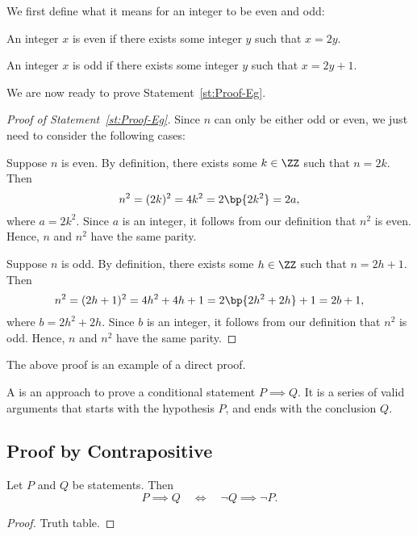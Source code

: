 We first define what it means for an integer to be even and odd:

\begin{definition}
    An integer $x$ is even if there exists some integer $y$ such that $x = 2y$.
\end{definition}

\begin{definition}
    An integer $x$ is odd if there exists some integer $y$ such that $x = 2y + 1$.
\end{definition}

We are now ready to prove Statement~\ref{st:Proof-Eg}.

\begin{proof}[Proof of Statement~\ref{st:Proof-Eg}]
    Since $n$ can only be either odd or even, we just need to consider the following cases:

     Suppose $n$ is even. By definition, there exists some $k \in \ZZ$ such that $n = 2k$. Then \[n^2 = (2k)^2 = 4k^2 = 2\bp{2k^2} = 2a,\] where $a = 2k^2$. Since $a$ is an integer, it follows from our definition that $n^2$ is even. Hence, $n$ and $n^2$ have the same parity.

     Suppose $n$ is odd. By definition, there exists some $h \in \ZZ$ such that $n = 2h + 1$. Then \[n^2 = (2h+1)^2 = 4h^2 + 4h + 1 = 2\bp{2h^2 + 2h} + 1 = 2b + 1,\] where $b = 2h^2 + 2h$. Since $b$ is an integer, it follows from our definition that $n^2$ is odd. Hence, $n$ and $n^2$ have the same parity.
\end{proof}

The above proof is an example of a direct proof.

\begin{definition}
    A  is an approach to prove a conditional statement $P \implies Q$. It is a series of valid arguments that starts with the hypothesis $P$, and ends with the conclusion $Q$.
\end{definition}

\subsection{Proof by Contrapositive}

\begin{proposition}
    Let $P$ and $Q$ be statements. Then \[P \implies Q \quad \iff \quad \lnot Q \implies \lnot P.\]
\end{proposition}
\begin{proof}
    Truth table.
\end{proof}

